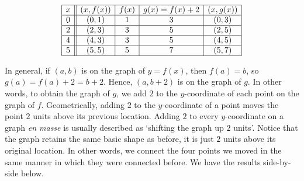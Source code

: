 \[ \begin{array}{|c||c|c|c|c|}  

\hline

 x & (x,f(x)) & f(x) & g(x)=f(x)+2 & (x, g(x)) \\ \hline
0  & (0,1)& 1 & 3 &(0, 3) \\  \hline
2 & (2,3) & 3 &  5 &(2,5) \\  \hline
4 & (4,3) & 3 &  5 &(4, 5) \\  \hline
5 & (5,5) & 5 &  7 &( 5 ,7) \\  \hline

\end{array} \] 

In general, if $(a,b)$ is on the graph of $y=f(x)$, then $f(a) = b$, so $g(a) = f(a) +2 = b+2$.  Hence, $(a,b+2)$ is on the graph of $g$. In other words, to obtain the graph of $g$, we add $2$ to the $y$-coordinate of each point on the graph of $f$.  Geometrically, adding $2$ to the $y$-coordinate of a point moves the point $2$ units above its previous location.  Adding $2$ to every $y$-coordinate on a graph \textit{en masse} is usually described as `shifting the graph up $2$ units'.  Notice that the graph retains the same basic shape as before, it is just $2$ units above its original location.  In other words, we connect the four points we moved in the same manner in which they were connected before.  We have the results side-by-side below.


